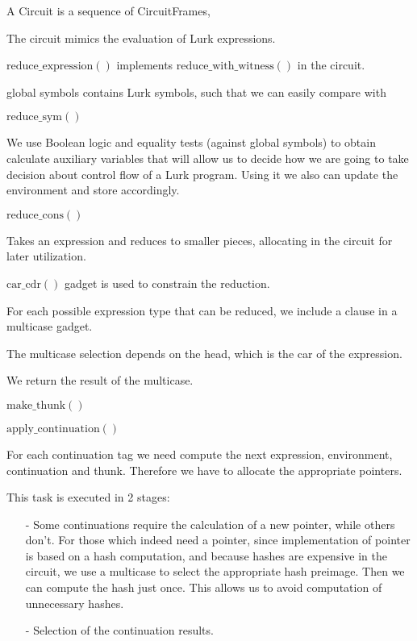 \documentclass[10pt, english]{article}
\newcommand{\redexp}{\mathrm{reduce\_expression}}
\newcommand{\redwithwit}{\mathrm{reduce\_with\_witness}}
\newcommand{\redcons}{\mathrm{reduce\_cons}}
\newcommand{\redsym}{\mathrm{reduce\_sym}}
\newcommand{\applycont}{\mathrm{apply\_continuation}}
\newcommand{\carcdr}{\mathrm{car\_cdr}}
\newcommand{\makethunk}{\mathrm{make\_thunk}}
\begin{document}
A Circuit is a sequence of CircuitFrames,

The circuit mimics the evaluation of Lurk expressions.

$\redexp()$ implements $\redwithwit()$ in the circuit.

global symbols contains Lurk symbols, such that we can easily compare with


$\redsym()$

 We use Boolean logic and equality tests (against global symbols) to obtain calculate auxiliary variables that will allow us to decide how we are going to take decision about control flow of a Lurk program. Using it we also can update the environment and store accordingly.

$\redcons()$

Takes an expression and reduces to smaller pieces, allocating in the circuit for later utilization.

$\carcdr()$ gadget is used to constrain the reduction.

For each possible expression type that can be reduced, we include a clause in a multicase gadget.

The multicase selection depends on the head, which is the car of the expression.

We return the result of the multicase.


$\makethunk()$

$\applycont()$

For each continuation tag we need compute the next expression, environment, continuation and thunk. Therefore we have to allocate the appropriate pointers.

This task is executed in 2 stages:

\begin{itemize}
	\item[-] Some continuations require the calculation of a new pointer, while others don't. For those which indeed need a pointer, since implementation of pointer is based on a hash computation, and because hashes are expensive in the circuit, we use a multicase to select the appropriate hash preimage. Then we can compute the hash just once. This allows us to avoid computation of unnecessary hashes.
	\item[-] Selection of the continuation results.
\end{itemize}
\end{document}
